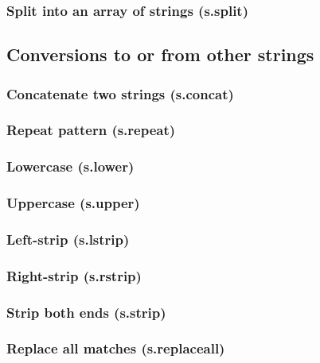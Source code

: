 \documentclass{article}
\theoremstyle{definition}
\begin{document}
\subsubsection{Split into an array of strings (s.split)}

\subsection{Conversions to or from other strings}

\subsubsection{Concatenate two strings (s.concat)}

\subsubsection{Repeat pattern (s.repeat)}

\subsubsection{Lowercase (s.lower)}

\subsubsection{Uppercase (s.upper)}

\subsubsection{Left-strip (s.lstrip)}

\subsubsection{Right-strip (s.rstrip)}

\subsubsection{Strip both ends (s.strip)}

\subsubsection{Replace all matches (s.replaceall)}
\end{document}
